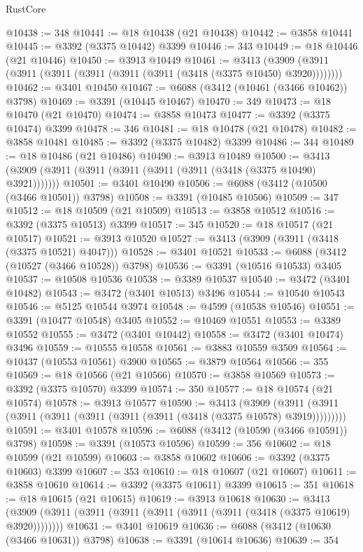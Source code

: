 \begin{lexlean}{RustCore}
\begin{coremodule}
@10438 := 348
@10441 := @18 @10438 (@21 @10438)
@10442 := @3858 @10441
@10445 := @3392 (@3375 @10442) @3399
@10446 := 343
@10449 := @18 @10446 (@21 @10446)
@10450 := @3913 @10449
@10461 := @3413 (@3909 (@3911 (@3911 (@3911 (@3911 (@3911 (@3911 (@3418 (@3375 @10450) @3920))))))))
@10462 := @3401 @10450
@10467 := @6088 (@3412 (@10461 (@3466 @10462)) @3798)
@10469 := @3391 (@10445 @10467)
@10470 := 349
@10473 := @18 @10470 (@21 @10470)
@10474 := @3858 @10473
@10477 := @3392 (@3375 @10474) @3399
@10478 := 346
@10481 := @18 @10478 (@21 @10478)
@10482 := @3858 @10481
@10485 := @3392 (@3375 @10482) @3399
@10486 := 344
@10489 := @18 @10486 (@21 @10486)
@10490 := @3913 @10489
@10500 := @3413 (@3909 (@3911 (@3911 (@3911 (@3911 (@3911 (@3418 (@3375 @10490) @3921)))))))
@10501 := @3401 @10490
@10506 := @6088 (@3412 (@10500 (@3466 @10501)) @3798)
@10508 := @3391 (@10485 @10506)
@10509 := 347
@10512 := @18 @10509 (@21 @10509)
@10513 := @3858 @10512
@10516 := @3392 (@3375 @10513) @3399
@10517 := 345
@10520 := @18 @10517 (@21 @10517)
@10521 := @3913 @10520
@10527 := @3413 (@3909 (@3911 (@3418 (@3375 @10521) @4047)))
@10528 := @3401 @10521
@10533 := @6088 (@3412 (@10527 (@3466 @10528)) @3798)
@10536 := @3391 (@10516 @10533) @3405
@10537 := @10508 @10536
@10538 := @3389 @10537
@10540 := @3472 (@3401 @10482)
@10543 := @3472 (@3401 @10513) @3496
@10544 := @10540 @10543
@10546 := @5125 @10544 @3974
@10548 := @4599 (@10538 @10546)
@10551 := @3391 (@10477 @10548) @3405
@10552 := @10469 @10551
@10553 := @3389 @10552
@10555 := @3472 (@3401 @10442)
@10558 := @3472 (@3401 @10474) @3496
@10559 := @10555 @10558
@10561 := @3883 @10559 @3509
@10564 := @10437 (@10553 @10561) @3900
@10565 := @3879 @10564
@10566 := 355
@10569 := @18 @10566 (@21 @10566)
@10570 := @3858 @10569
@10573 := @3392 (@3375 @10570) @3399
@10574 := 350
@10577 := @18 @10574 (@21 @10574)
@10578 := @3913 @10577
@10590 := @3413
    (@3909 (@3911 (@3911 (@3911 (@3911 (@3911 (@3911 (@3911 (@3418 (@3375 @10578) @3919)))))))))
@10591 := @3401 @10578
@10596 := @6088 (@3412 (@10590 (@3466 @10591)) @3798)
@10598 := @3391 (@10573 @10596)
@10599 := 356
@10602 := @18 @10599 (@21 @10599)
@10603 := @3858 @10602
@10606 := @3392 (@3375 @10603) @3399
@10607 := 353
@10610 := @18 @10607 (@21 @10607)
@10611 := @3858 @10610
@10614 := @3392 (@3375 @10611) @3399
@10615 := 351
@10618 := @18 @10615 (@21 @10615)
@10619 := @3913 @10618
@10630 := @3413 (@3909 (@3911 (@3911 (@3911 (@3911 (@3911 (@3911 (@3418 (@3375 @10619) @3920))))))))
@10631 := @3401 @10619
@10636 := @6088 (@3412 (@10630 (@3466 @10631)) @3798)
@10638 := @3391 (@10614 @10636)
@10639 := 354

\end{coremodule}
\end{lexlean}
